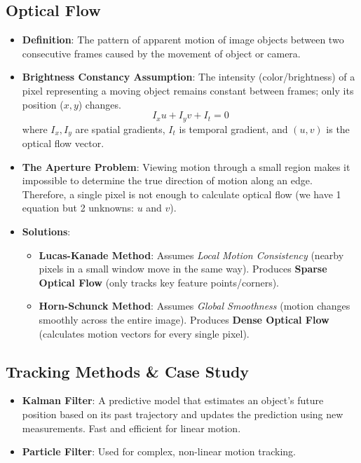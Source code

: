\documentclass[11pt,a4paper]{article}
\begin{document}
\subsection{Optical Flow}
\begin{itemize}
    \item \textbf{Definition}: The pattern of apparent motion of image objects between two consecutive frames caused by the movement of object or camera.
    \item \textbf{Brightness Constancy Assumption}: The intensity (color/brightness) of a pixel representing a moving object remains constant between frames; only its position ($x,y$) changes.
    \[ I_x u + I_y v + I_t = 0 \]
    where $I_x, I_y$ are spatial gradients, $I_t$ is temporal gradient, and $(u,v)$ is the optical flow vector.
    \item \textbf{The Aperture Problem}: Viewing motion through a small region makes it impossible to determine the true direction of motion along an edge. Therefore, a single pixel is not enough to calculate optical flow (we have 1 equation but 2 unknowns: $u$ and $v$).
    \item \textbf{Solutions}:
    \begin{itemize}
        \item \textbf{Lucas-Kanade Method}: Assumes \textit{Local Motion Consistency} (nearby pixels in a small window move in the same way). Produces \textbf{Sparse Optical Flow} (only tracks key feature points/corners).
        \item \textbf{Horn-Schunck Method}: Assumes \textit{Global Smoothness} (motion changes smoothly across the entire image). Produces \textbf{Dense Optical Flow} (calculates motion vectors for every single pixel).
    \end{itemize}
\end{itemize}

\subsection{Tracking Methods \& Case Study}
\begin{itemize}
    \item \textbf{Kalman Filter}: A predictive model that estimates an object's future position based on its past trajectory and updates the prediction using new measurements. Fast and efficient for linear motion.
    \item \textbf{Particle Filter}: Used for complex, non-linear motion tracking.
\end{itemize}
\end{document}
